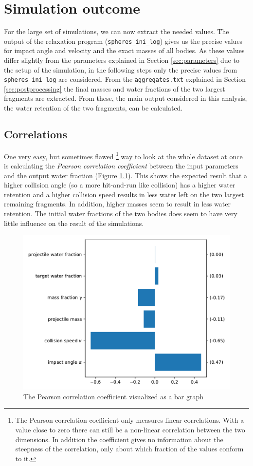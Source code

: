 \chapter{Simulation outcome}
\label{chapter:results}

For the large set of simulations, we can now extract the needed values. The output of the relaxation program (\texttt{spheres\_ini\_log}) gives us the precise values for impact angle and velocity and the exact masses of all bodies. As these values differ slightly from the parameters explained in Section \ref{sec:parameters} due to the setup of the simulation, in the following steps only the precise values from \texttt{spheres\_ini\_log} are considered. From the \texttt{aggregates.txt} explained in Section \ref{sec:postprocessing} the final masses and water fractions of the two largest fragments are extracted. From these, the main output considered in this analysis, the water retention of the two fragments, can be calculated. 

\section{Correlations}
\label{sec:cov}
One very easy, but sometimes flawed%
\footnote{The Pearson correlation coefficient only measures linear correlations. With a value close to zero there can still be a non-linear correlation between the two dimensions. In addition the coefficient gives no information about the steepness of the correlation, only about which fraction of the values conform to it.} 
way to look at the whole dataset at once is calculating the \textit{Pearson correlation coefficient} between the input parameters and the output water fraction (Figure \ref{fig:cov}). This shows the expected result that a higher collision angle (so a more hit-and-run like collision) has a higher water retention and a higher collision speed results in less water left on the two largest remaining fragments. In addition, higher masses seem to result in less water retention. The initial water fractions of the two bodies does seem to have very little influence on the result of the simulations.

\begin{figure}[h]
	\centering
	\includegraphics[width=0.6\linewidth]{images/cov.pdf}
	\caption{The Pearson correlation coefficient visualized as a bar graph}
	\label{fig:cov}
\end{figure}